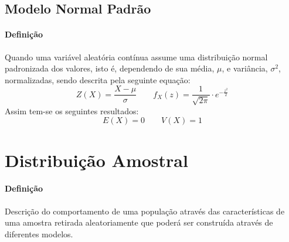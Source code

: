 \documentclass{article}
\begin{document}
        \subsection{Modelo Normal Padrão}
            \paragraph{Definição}Quando uma variável aleatória contínua assume uma distribuição normal padronizada dos valores, isto é, dependendo de sua média, $\mu$, e variância, $\sigma^{2}$, normalizadas, sendo descrita pela seguinte equação:
                \begin{equation}
                    \boxed{
                        Z(X) = \frac{X - \mu}{\sigma}
                    }
                    \qquad
                    \boxed{
                        f_{X}(z) = 
                        \frac{1}{\sqrt{2\pi}} \cdot 
                        e^{-\frac{z^{2}}{2}}
                    }
                \end{equation}
            Assim tem-se os seguintes resultados:
                \begin{equation}
                    \boxed{
                        E(X) = 0
                    }
                    \qquad
                    \boxed{
                        V(X) = 1
                    }
                \end{equation}
\newpage

    \section{Distribuição Amostral}
        \paragraph{Definição}Descrição do comportamento de uma população através das características de uma amostra retirada aleatoriamente que poderá ser construída através de diferentes modelos.
\end{document}
